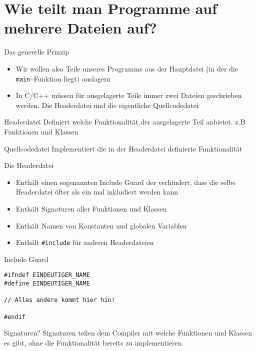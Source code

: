 \documentclass[presentation]{beamer}
\begin{document}
\section{Wie teilt man Programme auf mehrere Dateien auf?}
\label{sec:org7700d3e}
\begin{frame}[label={sec:org364e715},fragile]{Das generelle Prinzip}
 \begin{itemize}
\item Wir wollen also Teile unseres Programms aus der Hauptdatei (in der
die {\color{solarizedYellow}\verb!main!}--Funktion liegt) auslagern
\item In C/C++ müssen für ausgelagerte Teile immer zwei Dateien
geschrieben werden. Die \alert{Headerdatei} und die eigentliche
\alert{Quellcodedatei}
\end{itemize}
\begin{block}{Headerdatei}
Definiert \alert{welche Funktionalität} der ausgelagerte Teil anbietet. z.B.
Funktionen und Klassen
\end{block}
\begin{block}{Quellcodedatei}
\alert{Implementiert} die in der Headerdatei definierte Funktionalität
\end{block}
\end{frame}
\begin{frame}[label={sec:org40307c9},fragile]{Die Headerdatei}
 \begin{itemize}
\item Enthält einen sogenannten \alert{Include Guard} der verhindert, dass die
selbe Headerdatei öfter als ein mal inkludiert werden kann
\item Enthält \alert{Signaturen} aller Funktionen und Klassen
\item Enthält Namen von \alert{Konstanten} und \alert{globalen Variablen}
\item Enthält {\color{solarizedYellow}\verb!#include!} für anderen Headerdateien
\end{itemize}
\begin{block}{Include Guard}
\begin{verbatim}
#ifndef EINDEUTIGER_NAME
#define EINDEUTIGER_NAME

// Alles andere kommt hier hin!

#endif
\end{verbatim}
\end{block}
\begin{block}{Signaturen?}
Signaturen teilen dem Compiler mit welche Funktionen und Klassen es
gibt, ohne die Funktionalität bereits zu implementieren
\end{block}
\end{frame}
\end{document}
